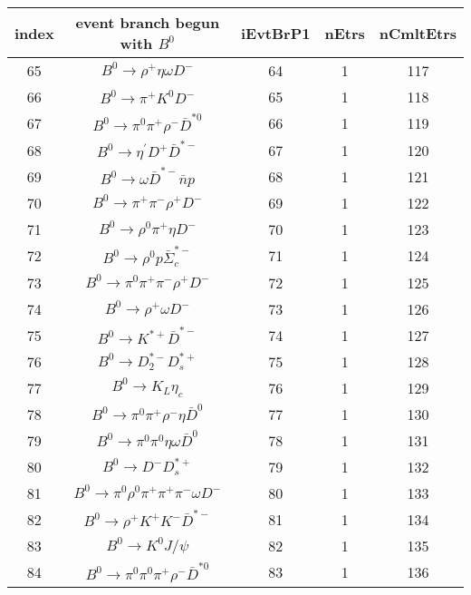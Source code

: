 \documentclass[landscape]{article}
\begin{document}
\begin{table}[htbp!]
\small
\centering
\begin{tabular}{|c|c|c|c|c|}
\hline
index & event branch begun with $ B^{0} $ & iEvtBrP1 & nEtrs & nCmltEtrs \\
\hline
65 & $ B^{0} \rightarrow \rho^{+} \eta \omega D^{-} $ & 64 & 1 & 117 \\
\hline
66 & $ B^{0} \rightarrow \pi^{+} K^{0} D^{-} $ & 65 & 1 & 118 \\
\hline
67 & $ B^{0} \rightarrow \pi^{0} \pi^{+} \rho^{-} \bar{D}^{*0} $ & 66 & 1 & 119 \\
\hline
68 & $ B^{0} \rightarrow \eta^{\prime} D^{+} \bar{D}^{*-} $ & 67 & 1 & 120 \\
\hline
69 & $ B^{0} \rightarrow \omega \bar{D}^{*-} \bar{n} p $ & 68 & 1 & 121 \\
\hline
70 & $ B^{0} \rightarrow \pi^{+} \pi^{-} \rho^{+} D^{-} $ & 69 & 1 & 122 \\
\hline
71 & $ B^{0} \rightarrow \rho^{0} \pi^{+} \eta D^{-} $ & 70 & 1 & 123 \\
\hline
72 & $ B^{0} \rightarrow \rho^{0} p \bar{\Sigma}_{c}^{*-} $ & 71 & 1 & 124 \\
\hline
73 & $ B^{0} \rightarrow \pi^{0} \pi^{+} \pi^{-} \rho^{+} D^{-} $ & 72 & 1 & 125 \\
\hline
74 & $ B^{0} \rightarrow \rho^{+} \omega D^{-} $ & 73 & 1 & 126 \\
\hline
75 & $ B^{0} \rightarrow K^{*+} \bar{D}^{*-} $ & 74 & 1 & 127 \\
\hline
76 & $ B^{0} \rightarrow D_{2}^{*-} D_{s}^{*+} $ & 75 & 1 & 128 \\
\hline
77 & $ B^{0} \rightarrow K_{L} \eta_{c} $ & 76 & 1 & 129 \\
\hline
78 & $ B^{0} \rightarrow \pi^{0} \pi^{+} \rho^{-} \eta \bar{D}^{0} $ & 77 & 1 & 130 \\
\hline
79 & $ B^{0} \rightarrow \pi^{0} \pi^{0} \eta \omega \bar{D}^{0} $ & 78 & 1 & 131 \\
\hline
80 & $ B^{0} \rightarrow D^{-} D_{s}^{*+} $ & 79 & 1 & 132 \\
\hline
81 & $ B^{0} \rightarrow \pi^{0} \rho^{0} \pi^{+} \pi^{+} \pi^{-} \omega D^{-} $ & 80 & 1 & 133 \\
\hline
82 & $ B^{0} \rightarrow \rho^{+} K^{+} K^{-} \bar{D}^{*-} $ & 81 & 1 & 134 \\
\hline
83 & $ B^{0} \rightarrow K^{0} J/\psi $ & 82 & 1 & 135 \\
\hline
84 & $ B^{0} \rightarrow \pi^{0} \pi^{0} \pi^{+} \rho^{-} \bar{D}^{*0} $ & 83 & 1 & 136 \\

\end{tabular}
\end{table}
\end{document}
